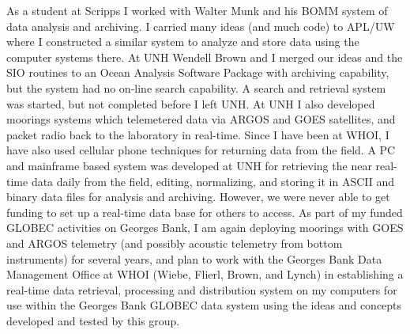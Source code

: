 	As a student at Scripps I worked with Walter Munk and his BOMM 
system of data analysis and archiving.  I carried many ideas (and much 
code) to APL/UW where I constructed a similar system to analyze and 
store data using the computer systems there.  At UNH Wendell Brown and I 
merged our ideas and the SIO routines to an Ocean Analysis Software 
Package with archiving capability, but the system had no on-line search 
capability.  A search and retrieval system was started, but not completed 
before I left UNH.  At UNH I also developed moorings systems which 
telemetered data via ARGOS and GOES satellites, and packet radio back to 
the laboratory in real-time.  Since I have been at WHOI, I have also used 
cellular phone techniques for returning data from the field.  A PC and 
mainframe based system was developed at UNH for retrieving the near 
real-time data daily from the field, editing, normalizing, and storing it in 
ASCII and binary data files for analysis and archiving.  However, we were 
never able to get funding to set up a real-time data base for others to 
access.  As part of my funded GLOBEC activities on Georges Bank, I am 
again deploying moorings with GOES and ARGOS telemetry (and possibly 
acoustic telemetry from bottom instruments) for several years, and plan 
to work with the Georges Bank Data Management Office at WHOI (Wiebe, 
Flierl, Brown, and Lynch) in establishing a real-time data retrieval, 
processing and distribution system on my computers for use within the 
Georges Bank GLOBEC data system using the ideas and concepts developed 
and tested by this group.
\newpage

